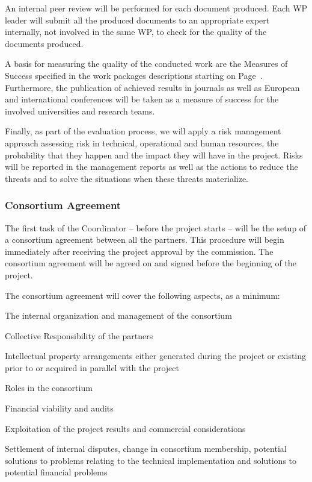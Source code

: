 An internal peer review will be performed for each document
produced. Each WP leader will submit all the produced documents to an
appropriate expert internally, not
involved in the same WP, to check for the quality of the documents
produced.

A basis for measuring the quality of the conducted work are the
Measures of Success specified in the work packages descriptions
starting on Page~\pageref{wp1}. Furthermore, the publication of
achieved results in journals as well as European and international
conferences will be taken as a measure of success for the involved
universities and research teams.

Finally, as part of the evaluation process, we will apply a risk
management approach assessing risk in technical, operational and human
resources, the probability that they happen and the impact they will
have in the project. Risks will be reported in the management reports
as well as the actions to reduce the threats and to solve the
situations when these threats materialize.

\subsubsection{Consortium Agreement}

The first task of the Coordinator --  before the project starts -- will be the setup of a consortium
agreement between all the partners. This
procedure will begin immediately after receiving the project approval by the
commission. The consortium agreement will be agreed on and signed
before the beginning of the project.

The consortium agreement will cover the following aspects, as a
minimum:
\begin{denseItemize}
\item The internal organization and management of the consortium
\item Collective Responsibility of the partners
\item Intellectual property arrangements either generated during the
project or existing prior to or acquired in parallel with the project
\item Roles in the consortium
\item Financial viability and audits
\item Exploitation of the project results and commercial considerations
\item Settlement of internal disputes, change in consortium
membership, potential solutions to problems relating to the technical
implementation and solutions to potential financial problems
\end{denseItemize}


